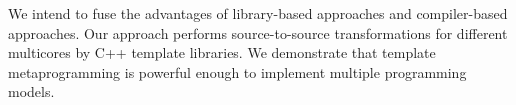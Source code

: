 We intend to fuse the advantages of library-based approaches and
compiler-based approaches. Our approach performs source-to-source
transformations for different multicores by C++ template libraries. We
demonstrate that template metaprogramming is powerful enough to
implement multiple programming models.




